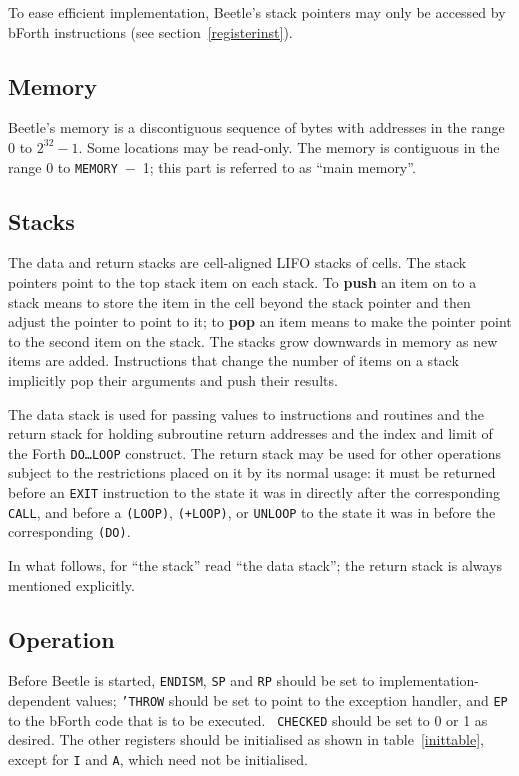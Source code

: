 \documentclass[english]{article}
\begin{document}
To ease efficient implementation, Beetle's stack pointers may only be accessed
by bForth instructions (see section~\ref{registerinst}).


\subsection{Memory}

Beetle's memory is a discontiguous sequence of bytes with addresses in the range $0$ to $2^{32}-1$. Some locations may be read-only. The memory is contiguous in the range $0$ to {\tt MEMORY}~$-$~1; this part is referred to as ``main memory''.

\subsection{Stacks}

The data and return stacks are cell-aligned LIFO stacks of cells. The stack
pointers point to the top stack item on each stack. To {\bf push} an item on to
a stack means to store the item in the cell beyond the stack pointer and then
adjust the pointer to point to it; to {\bf pop} an item means to make the
pointer point to the second item on the stack. The stacks grow downwards in
memory as new items are added. Instructions that change the number of items on a
stack implicitly pop their arguments and push their results.

The data stack is used for passing values to instructions and routines and the
return stack for holding subroutine return addresses and the index and limit of
the Forth {\tt DO\dots LOOP} construct. The return stack may be used for other
operations subject to the restrictions placed on it by its normal usage: it must
be returned before an {\tt EXIT} instruction to the state it was in directly
after the corresponding {\tt CALL}, and before a {\tt (LOOP)}, {\tt (+LOOP)}, or
{\tt UNLOOP} to the state it was in before the corresponding {\tt (DO)}.

In what follows, for ``the stack'' read ``the data stack''; the return stack is
always mentioned explicitly.


\subsection{Operation}
\label{operation}

Before Beetle is started, {\tt ENDISM}, {\tt SP} and {\tt RP} should be set
to implementation-dependent values; {\tt 'THROW} should be set to point to the
exception handler, and {\tt EP} to the bForth code that is to be executed. {\tt
CHECKED} should be set to 0 or 1 as desired. The other registers should be
initialised as shown in table~\ref{inittable}, except for {\tt I} and {\tt A},
which need not be initialised.
\end{document}

